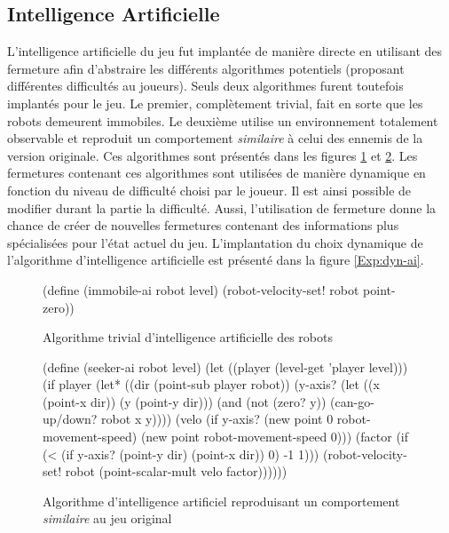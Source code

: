 \documentclass[12pt,twoside,letterpaper,francais]{book}
\begin{document}
\FloatBarrier
\subsection{Intelligence Artificielle}
L'intelligence artificielle du jeu fut implantée de manière directe en
utilisant des fermeture afin d'abstraire les différents algorithmes
potentiels (proposant différentes difficultés au joueurs). Seuls deux
algorithmes furent toutefois implantés pour le jeu. Le premier,
complètement trivial, fait en sorte que les robots demeurent
immobiles.  Le deuxième utilise un environnement totalement observable
et reproduit un comportement \emph{similaire} à celui des ennemis de
la version originale. Ces algorithmes sont présentés dans les figures
\ref{Exp:ai-imm} et \ref{Exp:ai-seek}. Les fermetures contenant ces
algorithmes sont utilisées de manière dynamique en fonction du niveau
de difficulté choisi par le joueur. Il est ainsi possible de modifier
durant la partie la difficulté. Aussi, l'utilisation de fermeture
donne la chance de créer de nouvelles fermetures contenant des
informations plus spécialisées pour l'état actuel du
jeu. L'implantation du choix dynamique de l'algorithme d'intelligence
artificielle est présenté dans la figure \ref{Exp:dyn-ai}.\\

\begin{figure}[htb!]
  \begin{schemecode}
(define (immobile-ai robot level)
  (robot-velocity-set! robot point-zero))
  \end{schemecode}
  \caption{Algorithme trivial d'intelligence artificielle des robots}
  \label{Exp:ai-imm}
\end{figure}

\begin{figure}[htb!]
  \begin{schemecode}
(define (seeker-ai robot level)
  (let ((player (level-get 'player level)))
    (if player
        (let* ((dir (point-sub player robot))
               (y-axis? (let ((x (point-x dir)) (y (point-y dir)))
                          (and (not (zero? y))
                               (can-go-up/down? robot x y))))
               (velo (if y-axis?
                         (new point 0 robot-movement-speed)
                         (new point robot-movement-speed 0)))
               (factor (if (< (if y-axis? (point-y dir) (point-x dir)) 0)
                           -1
                           1)))
          (robot-velocity-set! robot (point-scalar-mult velo factor))))))
  \end{schemecode}
  \caption{Algorithme d'intelligence artificiel reproduisant un
    comportement \emph{similaire} au jeu original}
  \label{Exp:ai-seek}
\end{figure}
\end{document}
